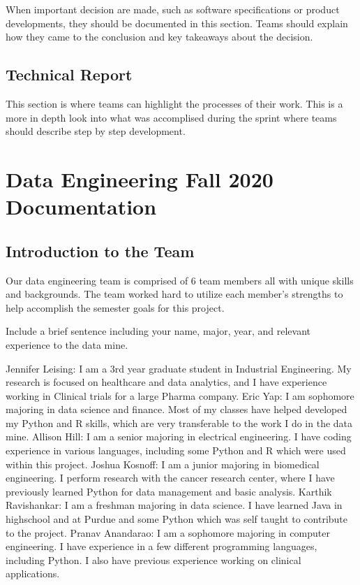 \documentclass[]{book}
\begin{document}
When important decision are made, such as software specifications or
product developments, they should be documented in this section. Teams
should explain how they came to the conclusion and key takeaways about
the decision.

\section{Technical Report}\label{technical-report}

This section is where teams can highlight the processes of their work.
This is a more in depth look into what was accomplised during the sprint
where teams should describe step by step development.

\chapter{Data Engineering Fall 2020
Documentation}\label{data-engineering-fall-2020-documentation}

\section{Introduction to the Team}\label{introduction-to-the-team}

Our data engineering team is comprised of 6 team members all with unique
skills and backgrounds. The team worked hard to utilize each member's
strengths to help accomplish the semester goals for this project.

Include a brief sentence including your name, major, year, and relevant
experience to the data mine.

Jennifer Leising: I am a 3rd year graduate student in Industrial
Engineering. My research is focused on healthcare and data analytics,
and I have experience working in Clinical trials for a large Pharma
company. Eric Yap: I am sophomore majoring in data science and finance.
Most of my classes have helped developed my Python and R skills, which
are very transferable to the work I do in the data mine. Allison Hill: I
am a senior majoring in electrical engineering. I have coding experience
in various languages, including some Python and R which were used within
this project. Joshua Kosnoff: I am a junior majoring in biomedical
engineering. I perform research with the cancer research center, where I
have previously learned Python for data management and basic analysis.
Karthik Ravishankar: I am a freshman majoring in data science. I have
learned Java in highschool and at Purdue and some Python which was self
taught to contribute to the project. Pranav Anandarao: I am a sophomore
majoring in computer engineering. I have experience in a few different
programming languages, including Python. I also have previous experience
working on clinical applications.
\end{document}
